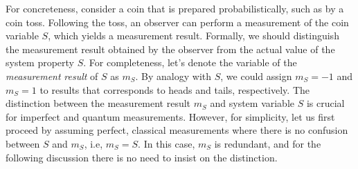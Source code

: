 For concreteness, consider a coin that is prepared probabilistically,
such as by a coin toss. Following the toss, an observer can perform
a measurement of the coin variable $S$, which yields a measurement
result. Formally, we should distinguish the measurement result obtained
by the observer from the actual value of the system property $S$.
For completeness, let's denote the variable of the \emph{measurement}
\emph{result} of $S$ as $m_{S}$. By analogy with $S$, we could
assign $m_{S}=-1$ and $m_{S}=1$ to results that corresponds to heads
and tails, respectively. The distinction between the measurement result
$m_{S}$ and system variable $S$ is crucial for imperfect and quantum
measurements. However, for simplicity, let us first proceed by assuming
perfect, classical measurements where there is no confusion between
$S$ and $m_{S}$, i.e, $m_{S}=S$. In this case, $m_{S}$ is redundant,
and for the following discussion there is no need to insist on the
distinction.

